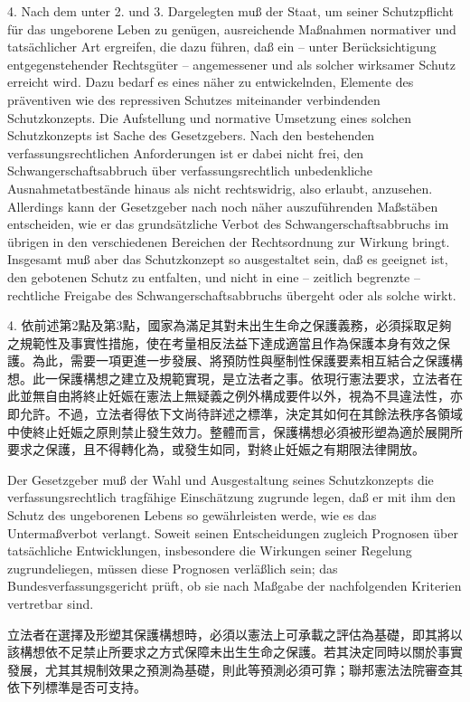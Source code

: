 \documentclass[12pt]{article}
\begin{document}
\begin{sourcepara}[title={原文D.66}]
4. Nach dem unter 2. und 3. Dargelegten muß der Staat, um seiner Schutzpflicht für das ungeborene Leben zu genügen, ausreichende Maßnahmen normativer und tatsächlicher Art ergreifen, die dazu führen, daß ein -- unter Berücksichtigung entgegenstehender Rechtsgüter -- angemessener und als solcher wirksamer Schutz erreicht wird. Dazu bedarf es eines näher zu entwickelnden, Elemente des präventiven wie des repressiven Schutzes miteinander verbindenden Schutzkonzepts. Die Aufstellung und normative Umsetzung eines solchen Schutzkonzepts ist Sache des Gesetzgebers. Nach den bestehenden verfassungsrechtlichen Anforderungen ist er dabei nicht frei, den Schwangerschaftsabbruch über verfassungsrechtlich unbedenkliche Ausnahmetatbestände hinaus als nicht rechtswidrig, also erlaubt, anzusehen. Allerdings kann der Gesetzgeber nach noch näher auszuführenden Maßstäben entscheiden, wie er das grundsätzliche Verbot des Schwangerschaftsabbruchs im übrigen in den verschiedenen Bereichen der Rechtsordnung zur Wirkung bringt. Insgesamt muß aber das Schutzkonzept so ausgestaltet sein, daß es geeignet ist, den gebotenen Schutz zu entfalten, und nicht in eine -- zeitlich begrenzte -- rechtliche Freigabe des Schwangerschaftsabbruchs übergeht oder als solche wirkt.
\end{sourcepara}
\begin{transpara}
4. 依前述第2點及第3點，國家為滿足其對未出生生命之保護義務，必須採取足夠之規範性及事實性措施，使在考量相反法益下達成適當且作為保護本身有效之保護。為此，需要一項更進一步發展、將預防性與壓制性保護要素相互結合之保護構想。此一保護構想之建立及規範實現，是立法者之事。依現行憲法要求，立法者在此並無自由將終止妊娠在憲法上無疑義之例外構成要件以外，視為不具違法性，亦即允許。不過，立法者得依下文尚待詳述之標準，決定其如何在其餘法秩序各領域中使終止妊娠之原則禁止發生效力。整體而言，保護構想必須被形塑為適於展開所要求之保護，且不得轉化為，或發生如同，對終止妊娠之有期限法律開放。
\end{transpara}

\begin{sourcepara}[title={原文D.67}]
Der Gesetzgeber muß der Wahl und Ausgestaltung seines Schutzkonzepts die verfassungsrechtlich tragfähige Einschätzung zugrunde legen, daß er mit ihm den Schutz des ungeborenen Lebens so gewährleisten werde, wie es das Untermaßverbot verlangt. Soweit seinen Entscheidungen zugleich Prognosen über tatsächliche Entwicklungen, insbesondere die Wirkungen seiner Regelung zugrundeliegen, müssen diese Prognosen verläßlich sein; das Bundesverfassungsgericht prüft, ob sie nach Maßgabe der nachfolgenden Kriterien vertretbar sind.
\end{sourcepara}
\begin{transpara}
立法者在選擇及形塑其保護構想時，必須以憲法上可承載之評估為基礎，即其將以該構想依不足禁止所要求之方式保障未出生生命之保護。若其決定同時以關於事實發展，尤其其規制效果之預測為基礎，則此等預測必須可靠；聯邦憲法法院審查其依下列標準是否可支持。
\end{transpara}
\end{document}
